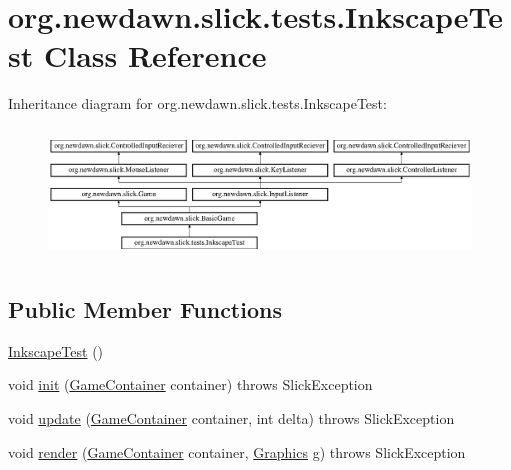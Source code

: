 \hypertarget{classorg_1_1newdawn_1_1slick_1_1tests_1_1_inkscape_test}{}\section{org.\+newdawn.\+slick.\+tests.\+Inkscape\+Test Class Reference}
\label{classorg_1_1newdawn_1_1slick_1_1tests_1_1_inkscape_test}
Inheritance diagram for org.\+newdawn.\+slick.\+tests.\+Inkscape\+Test\+:\begin{figure}[H]
\begin{center}
\leavevmode
\includegraphics[height=3.522012cm]{classorg_1_1newdawn_1_1slick_1_1tests_1_1_inkscape_test}
\end{center}
\end{figure}
\subsection*{Public Member Functions}
\begin{DoxyCompactItemize}
\item 
\mbox{\hyperlink{classorg_1_1newdawn_1_1slick_1_1tests_1_1_inkscape_test_af8c8454a56a3690c18456a069a166a90}{Inkscape\+Test}} ()
\item 
void \mbox{\hyperlink{classorg_1_1newdawn_1_1slick_1_1tests_1_1_inkscape_test_a8a36fbd071d89a6d399673e246fe9409}{init}} (\mbox{\hyperlink{classorg_1_1newdawn_1_1slick_1_1_game_container}{Game\+Container}} container)  throws Slick\+Exception 
\item 
void \mbox{\hyperlink{classorg_1_1newdawn_1_1slick_1_1tests_1_1_inkscape_test_ac8de6c02e969c4349f2b6b428d3f8630}{update}} (\mbox{\hyperlink{classorg_1_1newdawn_1_1slick_1_1_game_container}{Game\+Container}} container, int delta)  throws Slick\+Exception 
\item 
void \mbox{\hyperlink{classorg_1_1newdawn_1_1slick_1_1tests_1_1_inkscape_test_a76a9b74eff0ae959f572bc67c2f13124}{render}} (\mbox{\hyperlink{classorg_1_1newdawn_1_1slick_1_1_game_container}{Game\+Container}} container, \mbox{\hyperlink{classorg_1_1newdawn_1_1slick_1_1_graphics}{Graphics}} g)  throws Slick\+Exception 
\end{DoxyCompactItemize}
